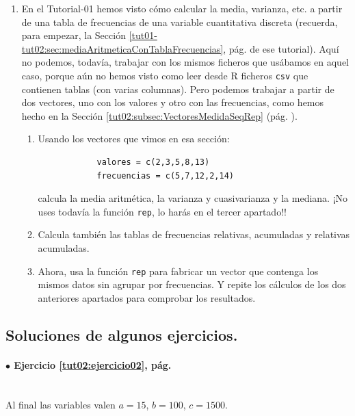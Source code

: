 \documentclass[10pt,a4paper]{article}\usepackage[]{graphicx}\usepackage[]{color}
\newcounter {cont01}
\begin{document}
\begin{enumerate}
  \item En el Tutorial-01 hemos visto cómo calcular la media, varianza, etc. a partir de una tabla de frecuencias de una variable cuantitativa discreta (recuerda, para empezar, la Sección \ref{tut01-tut02:sec:mediaAritmeticaConTablaFrecuencias}, pág. \pageref{tut01-tut02:sec:mediaAritmeticaConTablaFrecuencias} de ese tutorial). Aquí no podemos, todavía, trabajar con los mismos ficheros que usábamos en aquel caso, porque aún no hemos visto como leer desde R ficheros {\tt csv} que contienen tablas (con varias columnas). Pero podemos trabajar a partir de dos vectores, uno con los valores y otro con las frecuencias, como hemos hecho en la Sección \ref{tut02:subsec:VectoresMedidaSeqRep} (pág. \pageref{tut02:subsec:VectoresMedidaSeqRep}).
        \begin{enumerate}
          \item Usando los vectores que vimos en esa sección:
            \begin{verbatim}
            valores = c(2,3,5,8,13)
            frecuencias = c(5,7,12,2,14)
            \end{verbatim}
            calcula la media aritmética, la varianza y cuasivarianza y la mediana. ¡No uses todavía la función {\tt rep}, lo harás en el tercer apartado!!
          \item Calcula también las tablas de frecuencias relativas, acumuladas y relativas acumuladas.
          \item Ahora, usa la función {\tt rep} para fabricar un vector que contenga los mismos datos sin agrupar por frecuencias. Y repite los cálculos de los dos anteriores apartados para comprobar los resultados.
        \end{enumerate}

\end{enumerate}


\subsection*{Soluciones de algunos ejercicios.}



\paragraph{\bf $\bullet$ Ejercicio \ref{tut02:ejercicio02}, pág. \pageref{tut02:ejercicio02}}
\label{tut02:ejercicio02:sol}\quad\\
Al final las variables valen $a=15$, $b=100$, $c=1500$.
\end{document}
